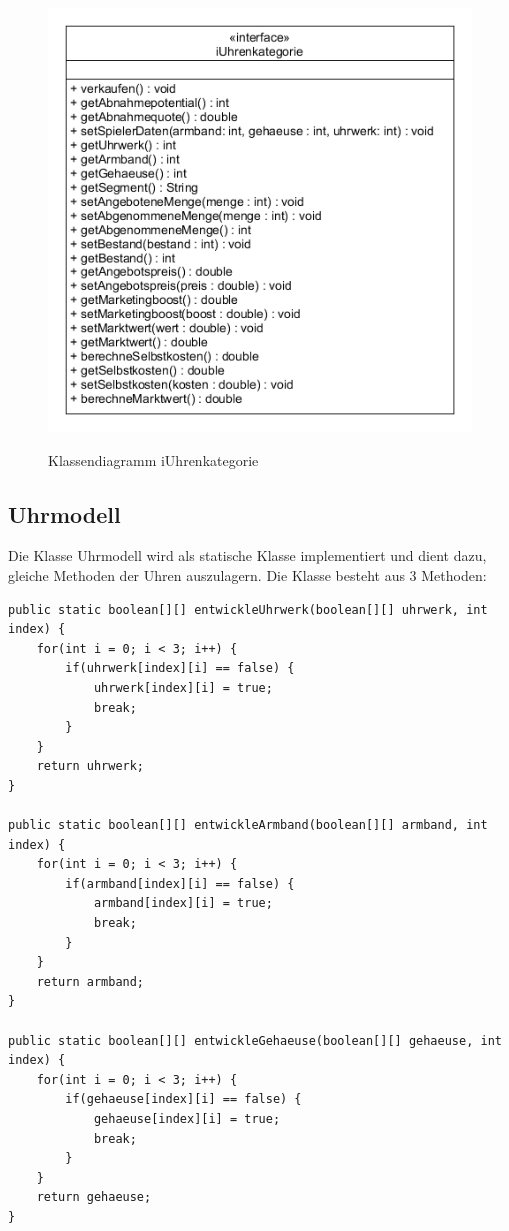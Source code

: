 \begin{figure}[!h]
	\centering
	\includegraphics[scale=0.7]{img/iUhrenkategorie.png} 
	\label{fig:iUhren}
	\caption{Klassendiagramm iUhrenkategorie}
\end{figure}

\subsection{Uhrmodell}
Die Klasse Uhrmodell wird als statische Klasse implementiert und dient dazu, gleiche Methoden der Uhren auszulagern. Die Klasse besteht aus 3 Methoden: 

\begin{lstlisting}
public static boolean[][] entwickleUhrwerk(boolean[][] uhrwerk, int index) {
	for(int i = 0; i < 3; i++) {
		if(uhrwerk[index][i] == false) {
			uhrwerk[index][i] = true;
			break;
		}
	}
	return uhrwerk;
}

public static boolean[][] entwickleArmband(boolean[][] armband, int index) {
	for(int i = 0; i < 3; i++) {
		if(armband[index][i] == false) {
			armband[index][i] = true;
			break;
		}
	}
	return armband;
}

public static boolean[][] entwickleGehaeuse(boolean[][] gehaeuse, int index) {
	for(int i = 0; i < 3; i++) {
		if(gehaeuse[index][i] == false) {
			gehaeuse[index][i] = true;
			break;
		}
	}
	return gehaeuse;
}	
\end{lstlisting}

